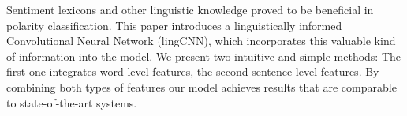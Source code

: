 Sentiment lexicons and other linguistic knowledge proved to be beneficial in polarity classification. This paper introduces a linguistically informed Convolutional Neural Network (lingCNN), which incorporates this valuable kind of information into the model. We present two intuitive and simple methods: The first one integrates word-level features, the second sentence-level features. By combining both types of features our model achieves results that are comparable to state-of-the-art systems.
